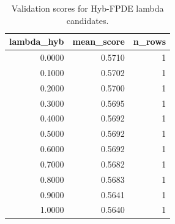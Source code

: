 \begin{table}[t]
\caption{Validation scores for Hyb-FPDE lambda candidates.}
\label{tab:lambda_distribution_computed}
\centering
\begin{tabular}{rrr}
\toprule
lambda\_hyb & mean\_score & n\_rows \\
\midrule
0.0000 & 0.5710 & 1 \\
0.1000 & 0.5702 & 1 \\
0.2000 & 0.5700 & 1 \\
0.3000 & 0.5695 & 1 \\
0.4000 & 0.5692 & 1 \\
0.5000 & 0.5692 & 1 \\
0.6000 & 0.5692 & 1 \\
0.7000 & 0.5682 & 1 \\
0.8000 & 0.5683 & 1 \\
0.9000 & 0.5641 & 1 \\
1.0000 & 0.5640 & 1 \\
\bottomrule
\end{tabular}

\end{table}
